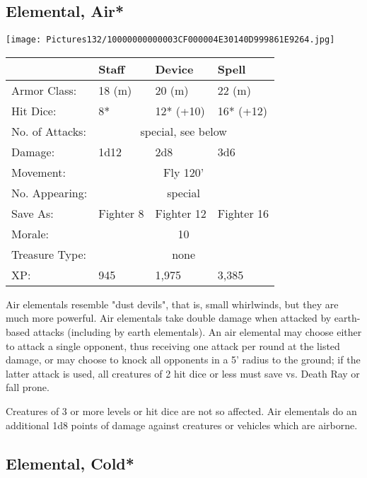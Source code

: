 \documentclass[a4paper,twoside,openany,10pt]{book}
\begin{document}
\begin{multicols}{2}
\subsection*{Elemental, Air*}\label{elemental-air}

\begin{center}
	\texttt{[image: Pictures132/10000000000003CF000004E30140D999861E9264.jpg]}
\end{center}

\begin{tabularx}{0.48\textwidth}[]{@{}lXXX@{}}
& Staff & Device & Spell \\\hline
Armor Class: & 18 (m) & 20 (m) & 22 (m) \\\hline
Hit Dice: & 8* & 12* (+10) & 16* (+12) \\\hline
No. of Attacks: & \multicolumn{3}{c}{special, see below} \\\hline
Damage: & 1d12 & 2d8 & 3d6 \\\hline
Movement: & \multicolumn{3}{c}{Fly 120'} \\\hline
No. Appearing: &  \multicolumn{3}{c}{special} \\\hline
Save As: & Fighter 8 & Fighter 12 & Fighter 16 \\\hline
Morale: & \multicolumn{3}{c}{10} \\\hline
Treasure Type: & \multicolumn{3}{c}{none} \\\hline
XP: & 945 & 1,975 & 3,385 \\\hline
\end{tabularx}\medskip



Air elementals resemble "dust devils", that is, small whirlwinds, but they are much more powerful. Air elementals take double damage when attacked by earth-based attacks (including by earth elementals). An air elemental may choose either to attack a single opponent, thus receiving one attack per round at the listed damage, or may choose to knock all opponents in a 5' radius to the ground; if the latter attack is used, all creatures of 2 hit dice or less must save vs. Death Ray or fall prone. 

Creatures of 3 or more levels or hit dice are not so affected. Air elementals do an additional 1d8 points of damage against creatures or vehicles which are airborne.

\subsection*{Elemental, Cold*}\label{elemental-cold}


\end{multicols}
\end{document}
